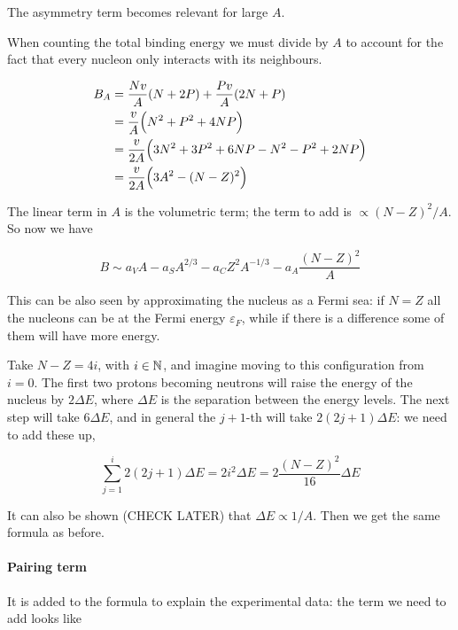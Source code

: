 \documentclass[main.tex]{subfiles}
\begin{document}
The asymmetry term becomes relevant for large \(A\).

When counting the total binding energy we must divide by \(A\) to account for the fact that every nucleon only interacts with its neighbours.

\begin{subequations}
\begin{align}
    B _A
    &= \frac{N v}{A} \qty(N + 2 P)  + \frac{P v}{A} \qty(2N + P) \\
    &= \frac{v}{A} \qty(N^2 + P^2 + 4 NP)  \\
    &= \frac{v}{2A} \qty(3N^2 + 3P^2 + 6NP - N^2 - P^2 + 2NP) \\
    &= \frac{v}{2A} \qty(3A^2 - (N-Z)^2)
\end{align}
\end{subequations}

The linear term in \(A\) is the volumetric term; the term to add is \(\propto (N-Z)^2 / A\). So now we have

\begin{equation}
    B \sim a_V A - a_S A ^{2/3} - a_C Z^2 A ^{-1/3} - a_A \frac{(N-Z)^2}{A}
\end{equation}

This can be also seen by approximating the nucleus as a Fermi sea: if \(N=Z\) all the nucleons can be at the Fermi energy \(\varepsilon_F\), while if there is a difference some of them will have more energy.

Take \(N-Z = 4i\), with \(i \in \mathbb{N}\), and imagine moving to this configuration from \(i=0\). The first two protons becoming neutrons will raise the energy of the nucleus by \(2 \Delta E\), where \(\Delta E\) is the separation between the energy levels. The next step will take \(6 \Delta E\), and in general  the \(j+1\)-th will take \(2 (2j+1) \Delta E\): we need to add these up,

\begin{equation}
    \sum _{j=1} ^{i} 2 (2j+1) \Delta E =   2 i^2 \Delta E = 2\frac{(N-Z)^2}{16} \Delta E
\end{equation}

It can also be shown (CHECK LATER) that \(\Delta E \propto 1/A\). Then we get the same formula as before.

\paragraph{Pairing term}

It is added to the formula to explain the experimental data: the term we need to add looks like
\end{document}
